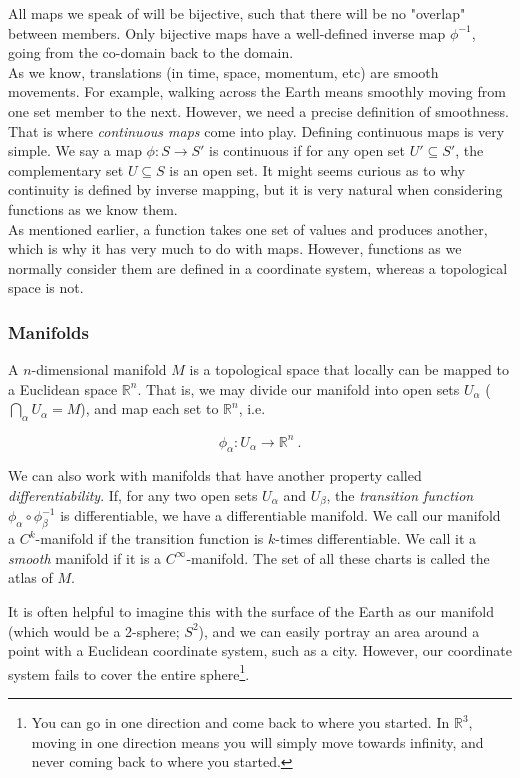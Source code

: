 \documentclass[10pt,twoside]{report}
\begin{document}
\begin{appendices}
	All maps we speak of will be bijective, such that there will be no "overlap" between members. Only bijective maps have a well-defined inverse map $\phi^{-1}$, going from the co-domain back to the domain.\\
	
	As we know, translations (in time, space, momentum, etc) are smooth movements. For example, walking across the Earth means smoothly moving from one set member to the next. However, we need a precise definition of smoothness. That is where \emph{continuous maps} come into play. Defining continuous maps is very simple. We say a map $\phi: S\rightarrow S'$ is continuous if for any open set $U' \subseteq S'$, the complementary set $U\subseteq S$ is an open set. It might seems curious as to why continuity is defined by inverse mapping, but it is very natural when considering functions as we know them.\\
	
	As mentioned earlier, a function takes one set of values and produces another, which is why it has very much to do with maps. However, functions as we normally consider them are defined in a coordinate system, whereas a topological space is not. 
	
	\subsubsection{Manifolds}
	A $n$-dimensional manifold $M$ is a topological space that locally can be mapped to a Euclidean space $\mathbb{R}^n$. That is, we may divide our manifold into open sets $U_\alpha$ ($\bigcap_\alpha U_\alpha = M$), and map each set to $\mathbb{R}^n$, i.e.
	
	\begin{equation}
	\phi_\alpha: U_\alpha \rightarrow \mathbb{R}^n \:.
	\end{equation}
	
	We can also work with manifolds that have another property called \emph{differentiability}. If, for any two open sets $U_\alpha$ and $U_\beta$, the \emph{transition function} $\phi_\alpha \circ \phi_\beta^{-1}$ is differentiable, we have a differentiable manifold. We call our manifold a $C^k$-manifold if the transition function is $k$-times differentiable. We call it a \emph{smooth} manifold if it is a $C^\infty$-manifold. The set of all these charts is called the atlas of $M$.
	
	It is often helpful to imagine this with the surface of the Earth as our manifold (which would be a 2-sphere; $S^2$), and we can easily portray an area around a point with a Euclidean coordinate system, such as a city. However, our coordinate system fails to cover the entire sphere\footnote{You can go in one direction and come back to where you started. In $\mathbb{R}^3$, moving in one direction means you will simply move towards infinity, and never coming back to where you started.}.\\
	

\end{appendices}
\end{document}
